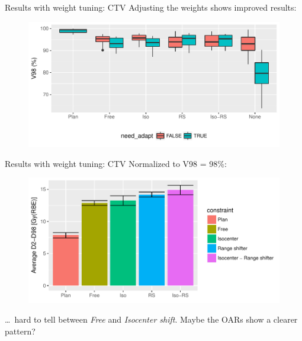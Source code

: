 \begin{frame}[c]{Results with weight tuning: CTV}
	Adjusting the weights shows improved results:
	\begin{figure}
        \includegraphics[width=\textwidth]{imgs/target_V98_weights_need_adapt.pdf}
    \end{figure}
\end{frame}


\begin{frame}[c]{Results with weight tuning: CTV}
    Normalized to V98 = 98\%:
    \begin{figure}
        \includegraphics[width=\textwidth]{imgs/target_D2_D98_weights_comparison.pdf}
    \end{figure}
    \ldots~hard to tell between \textit{Free} and \textit{Isocenter shift}. Maybe the OARs show a clearer pattern?
\end{frame}


